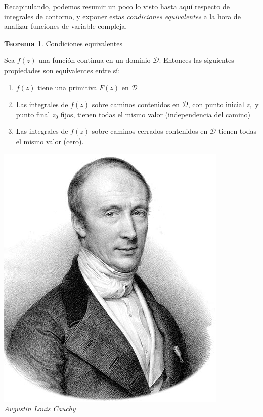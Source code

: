 \documentclass[12pt]{article}
\theoremstyle{definition}
\theoremstyle{theorem}
\newtheorem{theorem}{Teorema}[section]
\theoremstyle{corolary}
\begin{document}
Recapitulando, podemos resumir un poco lo visto hasta aqu\'i respecto de integrales de contorno, y exponer estas \textit{condiciones equivalentes} a la hora de analizar funciones de variable compleja.\\

\colorbox{magenta!40!white!80}{\parbox{\linewidth}{
\theoremstyle{theorem}
\begin{theorem} {Condiciones equivalentes}

Sea $f(z)$ una funci\'on continua en un dominio $\mathcal{D}$. Entonces las siguientes propiedades son equivalentes entre s\'i:
\begin{enumerate}
	\item $f(z)$ tiene una primitiva $F(z)$ en $\mathcal{D}$
	\item Las integrales de $f(z)$ sobre caminos contenidos en $\mathcal{D}$, con punto inicial $z_1$ y punto final $z_0$ fijos, tienen todas el mismo valor (independencia del camino)
	\item Las integrales de $f(z)$ sobre caminos cerrados contenidos en $\mathcal{D}$ tienen todas el mismo valor (cero).
\end{enumerate}

\end{theorem}}}
\linebreak
\linebreak

\begin{center}
	\includegraphics[scale=0.8]{cauchy.jpg}\\
	\textit{Augustin Louis Cauchy}
\end{center}
\end{document}
